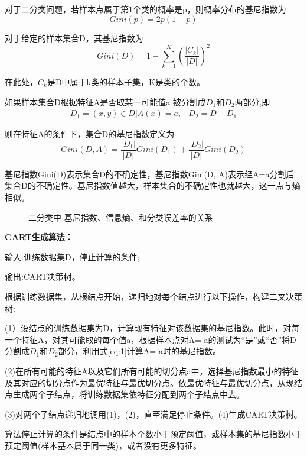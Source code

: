 \documentclass{JXUSTmodeling}
\begin{document}
对于二分类问题，若样本点属于第1个类的概率是p，则概率分布的基尼指数为
\begin{equation}
Gini(p)=2p(1-p)
\end{equation}

对于给定的样本集合D，其基尼指数为
\begin{equation}
Gini(D)=1-\sum_{k=1}^{K}\left(\frac{|C_{k}|}{|D|} \right)^2
\end{equation}

在此处，$ C_k $是D中属于k类的样本子集，K是类的个数。

如果样本集合D根据特征A是否取某一可能值a 被分割成$ D_1 $和$ D_{2} $两部分,即
\begin{align}
D_{1}={(x,y)\in D|A(x)=a},& D_{2}=D-D_{1}
\end{align}

则在特征A的条件下，集合D的基尼指数定义为
\begin{equation}
Gini(D,A)=\dfrac{|D_{1}|}{|D|}Gini(D_{1})+\dfrac{|D_{2}|}{|D|}Gini(D_{2})
\label{eq:1}
\end{equation}

基尼指数Gini(D)表示集合D的不确定性，基尼指数Gini(D, A)表示经A=a分割后集合D的不确定性。基尼指数值越大，样本集合的不确定性也就越大，这一点与熵相似。
\begin{figure}[!htbp]
	\centering
	\caption{二分类中  基尼指数、信息熵、和分类误差率的关系}
	\label{fig:8}
\end{figure}

\textbf{CART生成算法：}

输入:训练数据集D，停止计算的条件;

输出:CART决策树。

根据训练数据集，从根结点开始，递归地对每个结点进行以下操作，构建二叉决策树:

(1）设结点的训练数据集为D，计算现有特征对该数据集的基尼指数。此时，对每一个特征A，对其可能取的每个值a，根据样本点对A= a的测试为“是”或“否”将D分割成$ D_{1} $和$ D_{2} $部分，利用式\ref{eq:1}计算A= a时的基尼指数。

(2)在所有可能的特征A以及它们所有可能的切分点a中，选择基尼指数最小的特征及其对应的切分点作为最优特征与最优切分点。依最优特征与最优切分点，从现结点生成两个子结点，将训练数据集依特征分配到两个子结点中去。

(3)对两个子结点递归地调用(1)，(2)，直至满足停止条件。(4)生成CART决策树。

算法停止计算的条件是结点中的样本个数小于预定阈值，或样本集的基尼指数小于预定阈值(样本基本属于同一类)，或者没有更多特征。
\end{document}

